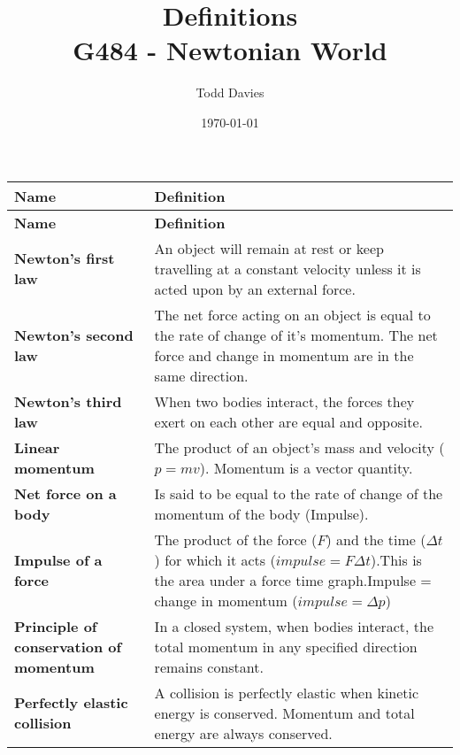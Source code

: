 \documentclass{article}
\title{Definitions \\ \large{G484 - Newtonian World}}
\author{Todd Davies}
\date{\today}
\begin{document}
\lhead{\today}

\maketitle

\thispagestyle{empty}

\begin{longtable}{>{\bf\centering\arraybackslash}p{1in} 
  p{\textwidth-4\tabcolsep-1in}}

\large{Name} & \large{\textbf{Definition}}\\ \midrule
\endfirsthead
\large{Name} & \large{\textbf{Definition}}\\ \midrule
\endhead
\midrule
\multicolumn{2}{r}{continued \ldots}
\endfoot
\endlastfoot
  Newton's first law & An object will remain at rest or keep 
    travelling at a constant velocity unless it is acted upon by an external 
    force.\\ \midrule
  Newton's second law & The net force acting on an object is equal
    to the rate of change of it's momentum. The net force and change in momentum
    are in the same direction.\\ \midrule
  Newton's third law & When two bodies interact, the forces they
    exert on each other are equal and opposite.\\ \midrule
  Linear momentum & The product of an object's mass and velocity
    ($p=mv$). Momentum is a vector quantity.\\ \midrule
  Net force on a body & Is said to be equal to the rate of change
    of the momentum of the body (Impulse).\\ \midrule
  Impulse of a force & The product of the force ($F$) and the time ($\Delta t$)
    for which it acts ($impulse = F \Delta t$).\newline \newline This is the
    area under a force time graph.\newline \newline Impulse = change in momentum
    ($impulse = \Delta p$)\\ \midrule
  Principle of conservation of momentum & In a closed system, when bodies
    interact, the total momentum in any specified direction remains constant.\\
    \midrule
  Perfectly elastic collision & A collision is perfectly elastic
    when kinetic energy is conserved. Momentum and total energy are always
    conserved.\\ \midrule

\end{longtable}
\end{document}
